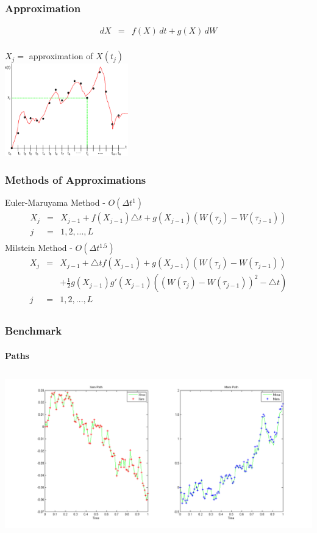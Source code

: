 \begin{frame}
   \frametitle{Approximation}
\vspace*{-3em}
	\begin{eqnarray*}
		dX &=& f(X) \, dt + g(X) \, dW \\
	\end{eqnarray*}
\vspace*{-3em}
	\begin{center}
		$X_{j} =$ approximation of $X(t_{j})$ \\ [20pt]
	\includegraphics[height=4cm]{approximation}
	\end{center}

\end{frame}



\begin{frame}
    \frametitle{Methods of Approximations}
	Euler-Maruyama Method - $O(\Delta t^{1})$
	\begin{eqnarray*}
		X_{j} &=& X_{j-1} + f(X_{j-1})\triangle t+ g(X_{j-1})(W(\tau_{j})-W(\tau_{j-1})) \\
		 j &=& 1,2,... ,L \\
	\end{eqnarray*}
	Milstein Method - $O(\Delta t^{1.5})$
	\begin{eqnarray*}
		X_{j} &=& X_{j-1} + \triangle tf(X_{j-1}) + g(X_{j-1})(W(\tau_{j})-W(\tau_{j-1})) 	\nonumber\\ 
		&& + \frac{1}{2} g(X_{j-1})g'(X_{j-1})((W(\tau_{j})-W(\tau_{j-1}))^{2}-\triangle t)\\
		 j &=& 1,2,... ,L \\
	\end{eqnarray*}
\end{frame}


\begin{frame}
    \frametitle{Benchmark}
	\framesubtitle{Paths}
\hspace*{-2cm}
\includegraphics[height=7cm]{testpaths} 
\end{frame}


